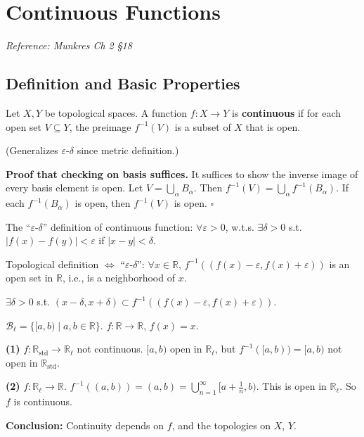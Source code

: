 \documentclass[11pt]{report}
\renewenvironment{proof}[1][Proof]{\noindent\textbf{#1.} }{\hfill$\square$\par\vspace{5pt}}
\begin{document}
\section{Continuous Functions}

\textit{Reference: Munkres Ch 2 \S 18}

\subsection{Definition and Basic Properties}

\begin{defbox}
Let $X, Y$ be topological spaces. A function $f: X \to Y$ is \textbf{continuous} if for each open set $V \subseteq Y$, the preimage $f^{-1}(V)$ is a subset of $X$ that is open.

(Generalizes $\varepsilon$-$\delta$ since metric definition.)
\end{defbox}

\begin{proof}[Proof that checking on basis suffices]
It suffices to show the inverse image of every basis element is open. Let $V = \bigcup_\alpha B_\alpha$. Then $f^{-1}(V) = \bigcup_\alpha f^{-1}(B_\alpha)$. If each $f^{-1}(B_\alpha)$ is open, then $f^{-1}(V)$ is open.
\end{proof}

\begin{exbox}
The ``$\varepsilon$-$\delta$'' definition of continuous function: $\forall \varepsilon > 0$, w.t.s. $\exists \delta > 0$ s.t. $|f(x) - f(y)| < \varepsilon$ if $|x - y| < \delta$.

Topological definition $\Leftrightarrow$ ``$\varepsilon$-$\delta$'': $\forall x \in \mathbb{R}$, $f^{-1}((f(x) - \varepsilon, f(x) + \varepsilon))$ is an open set in $\mathbb{R}$, i.e., is a neighborhood of $x$.

$\exists \delta > 0$ s.t. $(x - \delta, x + \delta) \subset f^{-1}((f(x) - \varepsilon, f(x) + \varepsilon))$. \checkmark
\end{exbox}

\begin{exbox}
$\mathcal{B}_\ell = \{[a,b) \mid a, b \in \mathbb{R}\}$. $f: \mathbb{R} \to \mathbb{R}$, $f(x) = x$.

\textbf{(1)} $f: \mathbb{R}_{\text{std}} \to \mathbb{R}_\ell$ not continuous. $[a,b)$ open in $\mathbb{R}_\ell$, but $f^{-1}([a,b)) = [a,b)$ not open in $\mathbb{R}_{\text{std}}$.

\textbf{(2)} $f: \mathbb{R}_\ell \to \mathbb{R}$. $f^{-1}((a,b)) = (a,b) = \bigcup_{n=1}^{\infty} [a + \frac{1}{n}, b)$. This is open in $\mathbb{R}_\ell$. So $f$ is continuous.

\textbf{Conclusion:} Continuity depends on $f$, and the topologies on $X$, $Y$.
\end{exbox}
\end{document}
